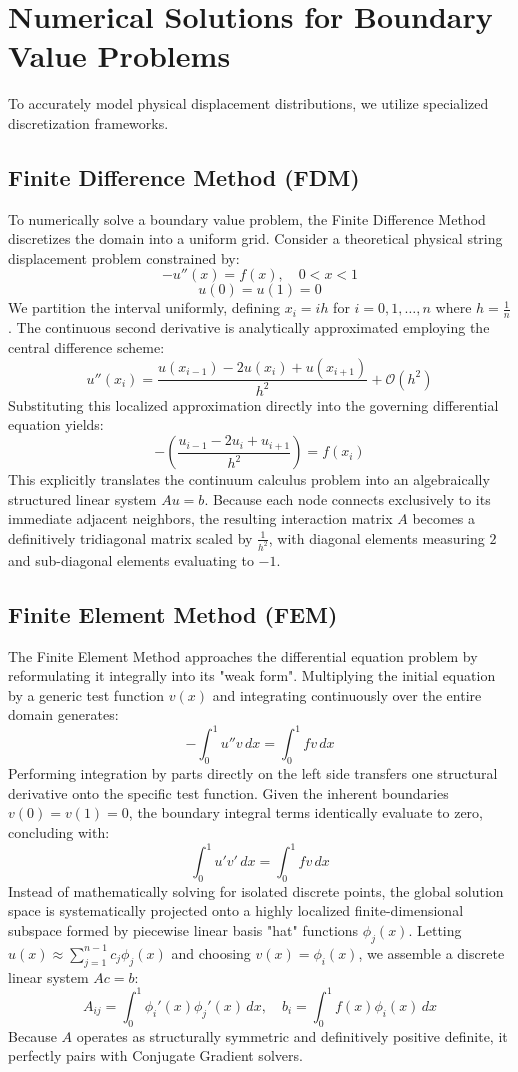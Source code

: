 \documentclass[12pt, a4paper]{article}
\theoremstyle{break}
\begin{document}
\section{Numerical Solutions for Boundary Value Problems}
To accurately model physical displacement distributions, we utilize specialized discretization frameworks.

\subsection{Finite Difference Method (FDM)}
To numerically solve a boundary value problem, the Finite Difference Method discretizes the domain into a uniform grid. Consider a theoretical physical string displacement problem constrained by:
$$-u''(x) = f(x), \quad 0 < x < 1$$
$$u(0) = u(1) = 0$$
We partition the interval uniformly, defining $x_i = i h$ for $i = 0, 1, \dots, n$ where $h = \frac{1}{n}$. The continuous second derivative is analytically approximated employing the central difference scheme:
$$u''(x_i) = \frac{u(x_{i-1}) - 2u(x_i) + u(x_{i+1})}{h^2} + \mathcal{O}(h^2)$$
Substituting this localized approximation directly into the governing differential equation yields:
$$-\left( \frac{u_{i-1} - 2u_i + u_{i+1}}{h^2} \right) = f(x_i)$$
This explicitly translates the continuum calculus problem into an algebraically structured linear system $Au = b$. Because each node connects exclusively to its immediate adjacent neighbors, the resulting interaction matrix $A$ becomes a definitively tridiagonal matrix scaled by $\frac{1}{h^2}$, with diagonal elements measuring $2$ and sub-diagonal elements evaluating to $-1$.

\subsection{Finite Element Method (FEM)}
The Finite Element Method approaches the differential equation problem by reformulating it integrally into its "weak form". Multiplying the initial equation by a generic test function $v(x)$ and integrating continuously over the entire domain generates:
$$-\int_0^1 u'' v \, dx = \int_0^1 f v \, dx$$
Performing integration by parts directly on the left side transfers one structural derivative onto the specific test function. Given the inherent boundaries $v(0)=v(1)=0$, the boundary integral terms identically evaluate to zero, concluding with:
$$\int_0^1 u' v' \, dx = \int_0^1 f v \, dx$$
Instead of mathematically solving for isolated discrete points, the global solution space is systematically projected onto a highly localized finite-dimensional subspace formed by piecewise linear basis "hat" functions $\phi_j(x)$. Letting $u(x) \approx \sum_{j=1}^{n-1} c_j \phi_j(x)$ and choosing $v(x) = \phi_i(x)$, we assemble a discrete linear system $Ac = b$:
$$A_{ij} = \int_0^1 \phi_i'(x) \phi_j'(x) \, dx, \quad b_i = \int_0^1 f(x) \phi_i(x) \, dx$$
Because $A$ operates as structurally symmetric and definitively positive definite, it perfectly pairs with Conjugate Gradient solvers.
\end{document}
